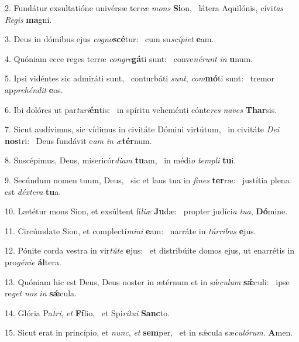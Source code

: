 2. Fundátur exsultatióne univérsæ ter\textit{ræ} \textit{mons} \textbf{Si}on, \ast\  látera Aquilónis, cívi\textit{tas} \textit{Re}\textit{gis} \textbf{ma}gni.\

3. Deus in dómibus ejus \textit{co}\textit{gno}\textbf{scé}tur: \ast\  cum su\textit{scí}\textit{pi}\textit{et} \textbf{e}am.\

4. Quóniam ecce reges terræ \textit{con}\textit{gre}\textbf{gá}ti sunt: \ast\  conve\textit{né}\textit{runt} \textit{in} \textbf{u}num.\

5. Ipsi vidéntes sic admiráti sunt, \dag\  conturbáti \textit{sunt}, \textit{com}\textbf{mó}ti sunt: \ast\  tremor ap\textit{pre}\textit{hén}\textit{dit} \textbf{e}os.\

6. Ibi dolóres ut par\textit{tu}\textit{ri}\textbf{én}tis: \ast\  in spíritu veheménti cónte\textit{res} \textit{na}\textit{ves} \textbf{Thar}sis.\

7. Sicut audívimus, sic vídimus in civitáte Dómini virtútum, \dag\  in civitáte \textit{De}\textit{i} \textbf{nos}tri: \ast\  Deus fundávit e\textit{am} \textit{in} \textit{æ}\textbf{tér}num.\

8. Suscépimus, Deus, misericór\textit{di}\textit{am} \textbf{tu}am, \ast\  in médi\textit{o} \textit{tem}\textit{pli} \textbf{tu}i.\

9. Secúndum nomen tuum, Deus, \dag\  sic et laus tua in \textit{fi}\textit{nes} \textbf{ter}ræ: \ast\  justítia plena est \textit{déx}\textit{te}\textit{ra} \textbf{tu}a.\

10. Lætétur mons Sion, et exsúltent fí\textit{li}\textit{æ} \textbf{Ju}dæ: \ast\  propter judíci\textit{a} \textit{tu}\textit{a}, \textbf{Dó}mine.\

11. Circúmdate Sion, et complectí\textit{mi}\textit{ni} \textbf{e}am: \ast\  narráte in \textit{túr}\textit{ri}\textit{bus} \textbf{e}jus.\

12. Pónite corda vestra in vir\textit{tú}\textit{te} \textbf{e}jus: \ast\  et distribúite domos ejus, ut enarrétis in pro\textit{gé}\textit{ni}\textit{e} \textbf{ál}tera.\

13. Quóniam hic est Deus, Deus noster in ætérnum et in sǽ\textit{cu}\textit{lum} \textbf{sǽ}culi: \ast\  ipse re\textit{get} \textit{nos} \textit{in} \textbf{sǽ}cula.\

14. Glória Pa\textit{tri}, \textit{et} \textbf{Fí}lio, \ast\  et Spi\textit{rí}\textit{tu}\textit{i} \textbf{Sanc}to.\

15. Sicut erat in princípio, et \textit{nunc}, \textit{et} \textbf{sem}per, \ast\  et in sǽcula sæ\textit{cu}\textit{ló}\textit{rum}. \textbf{A}men.\

